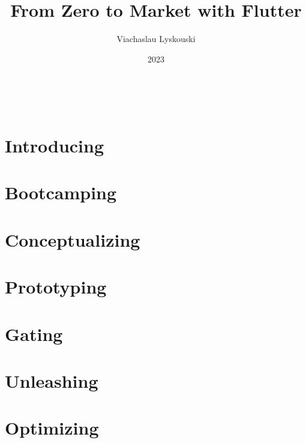 \documentclass[12pt, a4paper, twoside]{extreport}
\author{Viachaslau Lyskouski}
\title{From Zero to Market with Flutter}
\date{2023}
\begin{document}

\thispagestyle{empty}
~
\newpage



\tableofcontents

\newpage
\section*{Introducing}


\newpage
\section{Bootcamping}



\newpage
\section{Conceptualizing}


\newpage
\section{Prototyping}


\newpage





\newpage
\section{Gating}







\newpage
\section{Unleashing}







\newpage
\section{Optimizing}








\end{document}

